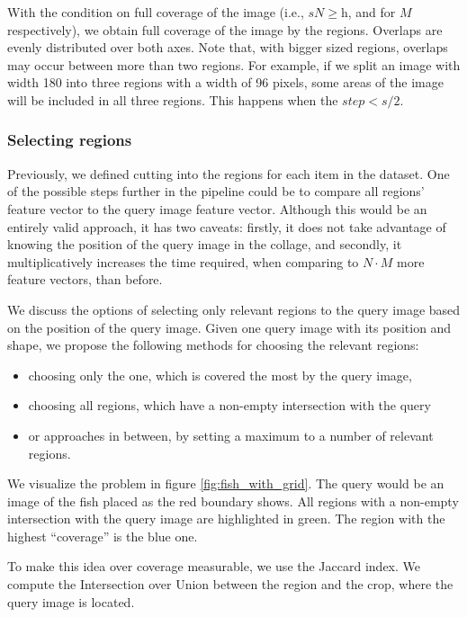 With the condition on full coverage of the image (i.e., $s N \geq \text{h}$, and for $M$ respectively), we obtain full coverage of the image by the regions. Overlaps are evenly distributed over both axes. Note that, with bigger sized regions, overlaps may occur between more than two regions. For example, if we split an image with width 180 into three regions with a width of 96 pixels, some areas of the image will be included in all three regions. This happens when the $step < s/2$.

\subsubsection{Selecting regions}

Previously, we defined cutting into the regions for each item in the dataset. One of the possible steps further in the pipeline could be to compare all regions' feature vector to the query image feature vector. Although this would be an entirely valid approach, it has two caveats: firstly, it does not take advantage of knowing the position of the query image in the collage, and secondly, it multiplicatively increases the time required, when comparing to $N \cdot M$ more feature vectors, than before.

We discuss the options of selecting only relevant regions to the query image based on the position of the query image. Given one query image with its position and shape, we propose the following methods for choosing the relevant regions:
\begin{itemize}
  \item choosing only the one, which is covered the most by the query image,
  \item choosing all regions, which have a non-empty intersection with the query
  \item or approaches in between, by setting a maximum to a number of relevant regions.
\end{itemize}

We visualize the problem in figure \ref{fig:fish_with_grid}. The query would be an image of the fish placed as the red boundary shows. All regions with a non-empty intersection with the query image are highlighted in green. The region with the highest ``coverage'' is the blue one.

To make this idea over coverage measurable, we use the Jaccard index. We compute the Intersection over Union between the region and the crop, where the query image is located. 

